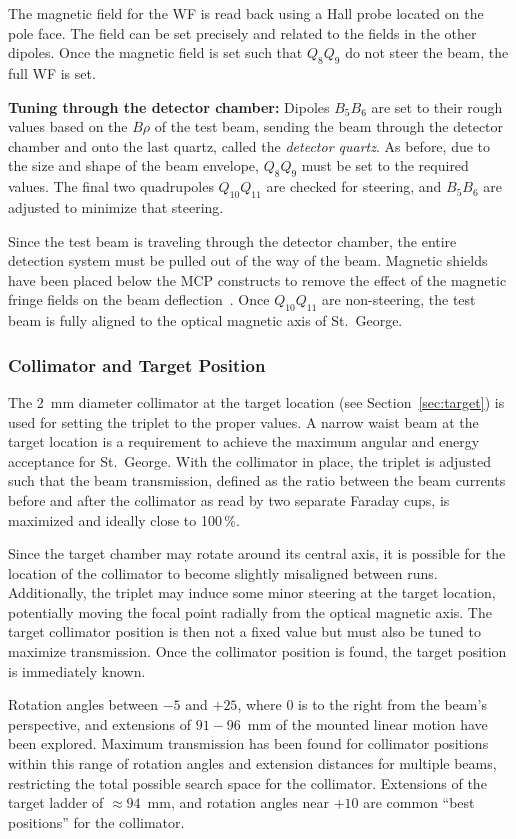 The magnetic field for the WF is read back using a Hall probe located
on the pole face. The field can be set precisely and related to the fields in
the other dipoles. Once the magnetic field is set such that $Q_8Q_9$ do not
steer the beam, the full WF is set.

\textbf{Tuning through the detector chamber:}
Dipoles $B_5B_6$ are set to their rough values based on the $B\rho$ of the test
beam, sending the beam through the detector chamber and onto the last quartz,
called the \emph{detector quartz}. As before, due to the size and shape of the
beam envelope, $Q_8Q_9$ must be set to the required values. The final two
quadrupoles $Q_{10}Q_{11}$ are checked for steering, and $B_5B_6$ are adjusted
to minimize that steering.

Since the test beam is traveling through the detector chamber, the entire
detection system must be pulled out of the way of the beam. Magnetic shields
have been placed below the MCP constructs to remove the effect of the magnetic
fringe fields on the beam deflection~\cite{MoralesDNP}. Once $Q_{10}Q_{11}$ are
non-steering, the test beam is fully aligned to the optical magnetic axis of
St.\ George.

\subsubsection{Collimator and Target Position}

The 2~mm diameter collimator at the target location
(see Section~\ref{sec:target}) is
used for setting the triplet to the proper values. A narrow waist beam at the
target location is a requirement to achieve the maximum angular and energy
acceptance
for St.\ George. With the collimator in place, the triplet is adjusted such
that the beam transmission, defined as the ratio between the beam currents
before and after the collimator as read by two separate Faraday cups, is
maximized and ideally close to 100\,\%.

Since the target chamber may rotate around its central axis, it is possible for
the location of the collimator to become slightly misaligned between runs.
Additionally,
the triplet may induce some minor steering at the target location, potentially
moving the focal point radially from the optical magnetic axis. The target
collimator position is then not a fixed value but must also be tuned to
maximize transmission. Once the collimator position is found, the target
position is immediately known.

Rotation angles between $-5$ and $+25$\degree{}, where 0\degree{} is to the
right from the beam's perspective, and extensions of $91-96$~mm of the mounted
linear motion have been explored. Maximum transmission has been found for
collimator positions within this range of rotation angles and extension
distances for multiple beams, restricting
the total possible search space for the collimator. Extensions of the
target ladder of $\approx 94$~mm, and rotation angles near $+10$\degree{} are
common ``best positions'' for the collimator.

